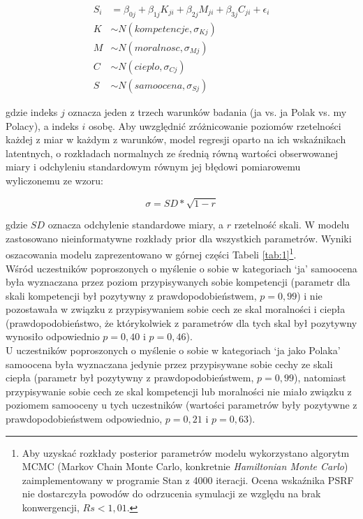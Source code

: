 \documentclass[man]{apa6}
\begin{document}
\begin{equation}\label{eq:1}
\begin{split}
S_{i} & = \beta_{0j} + \beta_{1j}K_{ji} + \beta_{2j}M_{ji} + \beta_{3j}C_{ji} + \epsilon_{i} \\
K & \sim N(kompetencje, \sigma_{Kj}) \\
M & \sim N(moralnosc, \sigma_{Mj}) \\
C & \sim N(cieplo, \sigma_{Cj}) \\
S & \sim N(samoocena, \sigma_{Sj})
\end{split}
\end{equation}

gdzie indeks $j$ oznacza jeden z trzech warunków badania (ja vs. ja Polak vs. my Polacy), a indeks $i$ osobę. Aby uwzględnić zróżnicowanie poziomów rzetelności każdej z miar w każdym z warunków, model regresji oparto na ich wskaźnikach latentnych, o rozkładach normalnych ze średnią równą wartości obserwowanej miary i odchyleniu standardowym równym jej błędowi pomiarowemu wyliczonemu ze wzoru:

\begin{equation}\label{eq:err}
\sigma = SD*\sqrt{1 - r}
\end{equation}

gdzie $SD$ oznacza odchylenie standardowe miary, a $r$ rzetelność skali. W modelu zastosowano nieinformatywne rozkłady prior dla wszystkich parametrów. Wyniki oszacowania modelu zaprezentowano w górnej części Tabeli \ref{tab:1}\footnote{Aby uzyskać rozkłady posterior parametrów modelu wykorzystano algorytm MCMC (Markov Chain Monte Carlo, konkretnie \emph{Hamiltonian Monte Carlo}) zaimplementowany w programie Stan \parencite{carpenter2016} z 4000 iteracji. Ocena wskaźnika PSRF nie dostarczyła powodów do odrzucenia symulacji ze względu na brak konwergencji, $Rs < 1,01$.}. \\

Wśród uczestników poproszonych o myślenie o sobie w kategoriach `ja' samoocena była wyznaczana przez poziom przypisywanych sobie kompetencji (parametr dla skali kompetencji był pozytywny z prawdopodobieństwem, $p = 0,99$) i nie pozostawała w związku z przypisywaniem sobie cech ze skal moralności i ciepła (prawdopodobieństwo, że którykolwiek z parametrów dla tych skal był pozytywny wynosiło odpowiednio $p = 0,40$ i $p = 0,46$). \\

U uczestników poproszonych o myślenie o sobie w kategoriach `ja jako Polaka' samoocena była wyznaczana jedynie przez przypisywane sobie cechy ze skali ciepła (parametr był pozytywny z prawdopodobieństwem, $p = 0,99$), natomiast przypisywanie sobie cech ze skal kompetencji lub moralności nie miało związku z poziomem samooceny u tych uczestników (wartości parametrów były pozytywne z prawdopodobieństwem odpowiednio, $p = 0,21$ i $p = 0,63$). \\
\end{document}
